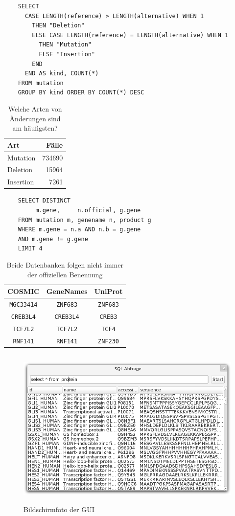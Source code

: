 \documentclass{scrartcl}
\begin{document}
\begin{table}[H]
	\noindent\begin{minipage}{.4\hsize}
	\begin{verbatim}
	SELECT
	  CASE LENGTH(reference) > LENGTH(alternative) WHEN 1
	    THEN "Deletion"
	    ELSE CASE LENGTH(reference) = LENGTH(alternative) WHEN 1
	      THEN "Mutation"
	      ELSE "Insertion"
	    END
	  END AS kind, COUNT(*)
	FROM mutation
	GROUP BY kind ORDER BY COUNT(*) DESC
	\end{verbatim}
	\end{minipage}
	\begin{minipage}{.6\hsize}\vspace{2cm}
	\hfill\begin{tabular}{lr}
	\toprule
	Art & Fälle \\
	\midrule
	Mutation&734690 \\
	Deletion&15964 \\
	Insertion&7261 \\
	\bottomrule
	\end{tabular}
	\end{minipage}
	\caption{Welche Arten von Änderungen sind am häufigsten?}\label{q6}
\end{table}

\begin{table}[H]
	\noindent\begin{minipage}{.5\hsize}
	\begin{verbatim}
	SELECT DISTINCT
	     m.gene,     n.official, g.gene
	FROM mutation m, genename n, product g
	WHERE m.gene = n.a AND n.b = g.gene
	AND m.gene != g.gene
	LIMIT 4
	\end{verbatim}
	\end{minipage}
	\begin{minipage}{.5\hsize}
	\hfill\begin{tabular}{ccc}
	\toprule
	COSMIC & GeneNames & UniProt \\
	\midrule
	\texttt{MGC33414}&\texttt{ZNF683}&\texttt{ZNF683}\\
	\texttt{CREB3L4}&\texttt{CREB3L4}&\texttt{CREB3}\\
	\texttt{TCF7L2}&\texttt{TCF7L2}&\texttt{TCF4}\\
	\texttt{RNF141}&\texttt{RNF141}&\texttt{ZNF230}\\
	\bottomrule
	\end{tabular}
	\end{minipage}
	\caption{Beide Datenbanken folgen nicht immer der offiziellen Benennung}\label{q7}
\end{table}

\begin{figure}[H]\centering
	\includegraphics[height=8cm]{screenshot}
	\caption{Bildschirmfoto der GUI}
\end{figure}
\end{document}
